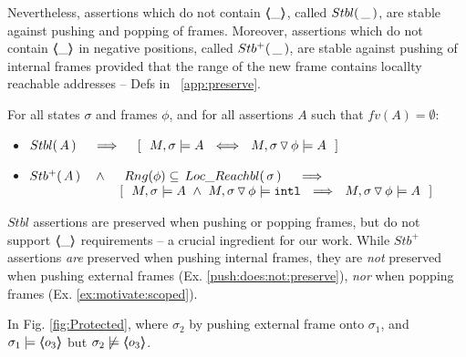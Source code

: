  

Nevertheless,  assertions which do  not contain  $\langle\!\!\langle \_ \rangle\!\!\rangle$, called   ${Stbl(\, \_\, )}$, are stable against pushing and popping of frames.  
Moreover, assertions which do  not contain $\langle\!\!\langle \_ \rangle\!\!\rangle$ in negative positions, called ${Stb^+(\, \_\, )}$,  are stable against pushing  of {internal} frames provided that the range of the new frame contains locallty reachable addresses -- 
\cf  Defs   in \A\ \ref{app:preserve}.

\begin{lemma}
For all  states $\sigma$ and frames $\phi$, and for all assertions $A$ such that $ fv(A)=\emptyset$:
\label{l:preserve:asrt}
 
\begin{itemize}
\item 
$\Stable{A}\ \ \ \  \Longrightarrow \ \  \ \  [\ \ M, \sigma \models A \ \ \Longleftrightarrow \ \  M,{\PushSLong \phi \sigma} \models A\ \ ]$
\item 
\label{l:preserve:asrt:two}
$\Pos{A}\ \ \  \wedge \ \ \  {   \ Rng(\phi)\subseteq \LRelevantO   \sigma \ } \ \ \ \Longrightarrow $
\\
$\strut \hspace{2cm} \ \  \ \  [\ \ M, \sigma \models A \  \wedge \  M, {\PushSLong \phi \sigma} \models  \intThis \ \ \Longrightarrow \ \  M,{\PushSLong \phi \sigma} \models A\ \ ]$
%
\end{itemize}
\end{lemma}

 
$Stbl$ assertions are preserved when pushing or popping frames, but do not support %
$\langle\!\!\langle \_ \rangle\!\!\rangle$ requirements -- a crucial ingredient for our work. While
$Stb^+$ assertions \emph{are} preserved  when pushing  internal frames,   they  are \emph{not} preserved when pushing  external frames   (\cf  Ex. \ref{push:does:not:preserve}), \emph{nor} when popping frames   (\cf Ex. \ref{ex:motivate:scoped}). 

 
\begin{example}
\label{push:does:not:preserve}
In    Fig. \ref{fig:Protected}, where $\sigma_2$ by pushing external frame onto $\sigma_1$, and 
$\sigma_1 \models \langle\!\!\langle o_3 \rangle\!\!\rangle$ but $\sigma_2 \not\models \langle\!\!\langle o_3 \rangle\!\!\rangle$.
\end{example}
 

